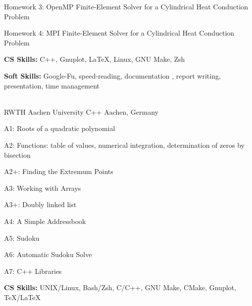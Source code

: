 \begin{cventries}
{\begin{cvitems}
        \item {Homework 3: OpenMP Finite-Element Solver for a Cylindrical Heat Conduction Problem}
        \item {Homework 4: MPI Finite-Element Solver for a Cylindrical Heat Conduction Problem}
        \item {\textbf{CS Skills:} C++, Gnuplot, \LaTeX, Linux, GNU Make, Zsh}
        \item {\textbf{Soft Skills:} Google-Fu, speed-reading, documentation , report writing, presentation, time management}
      \end{cvitems}
    }\\
  \cventry
    {RWTH Aachen University} %
    {C++} %
    {Aachen, Germany} %
    {} %
    {
      \begin{cvitems} %
        \item {A1: Roots of a quadratic polynomial}
        \item {A2: Functions: table of values, numerical integration, determination of zeros by bisection}
        \item {A2+: Finding the Extremum Points}
        \item {A3: Working with Arrays}
        \item {A3+: Doubly linked list}
        \item {A4: A Simple Addressbook}
        \item {A5: Sudoku}
        \item {A6: Automatic Sudoku Solve}
        \item {A7: C++ Libraries} 
        \item {\textbf{CS Skills:} UNIX/Linux, Bash/Zsh, C/C++, GNU Make, CMake, Gnuplot, \TeX/\LaTeX}

\end{cvitems}}
\end{cventries}
